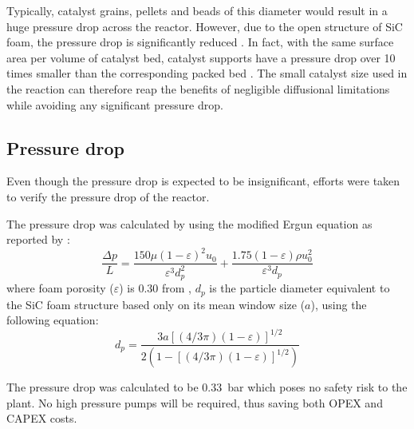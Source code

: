 Typically, catalyst grains, pellets and beads of this diameter would result in a huge pressure drop across the reactor. However, due to the open structure of SiC foam, the pressure drop is significantly reduced \cite{duong-viet_silicon_2016}. In fact, with the same surface area per volume of catalyst bed, catalyst supports have a pressure drop over 10 times smaller than the corresponding packed bed \cite{richardson_properties_2000}. The small catalyst size used in the reaction can therefore reap the benefits of negligible diffusional limitations while avoiding any significant pressure drop.

\subsection{Pressure drop}
Even though the pressure drop is expected to be insignificant, efforts were taken to verify the pressure drop of the reactor.

The pressure drop was calculated by using the modified Ergun equation as reported by \textcite{lacroix_pressure_2007}: 
\begin{equation}
    \frac{\Delta p}{L} = \frac{150 \mu (1- \varepsilon)^2 u_0}{\varepsilon^3 d_p^2} + \frac{1.75(1-\varepsilon)\rho u_0^2}{\varepsilon^3 d_p}
    \label{eqn:ergun}
\end{equation}
where foam porosity ($\varepsilon$) is 0.30 from \cite{jang_thermophysical_2007}, $d_p$ is the particle diameter equivalent to the SiC foam structure based only on its mean window size ($a$), using the following equation:
\begin{equation}
d_{p}=\frac{3a[(4 / 3 \pi)(1-\varepsilon)]^{1 / 2}}{2(1-[(4 / 3 \pi)(1-\varepsilon)]^{1 / 2})}
\end{equation}

The pressure drop was calculated to be \SI{0.33}{\bar} which poses no safety risk to the plant. No high pressure pumps will be required, thus saving both OPEX and CAPEX costs.

